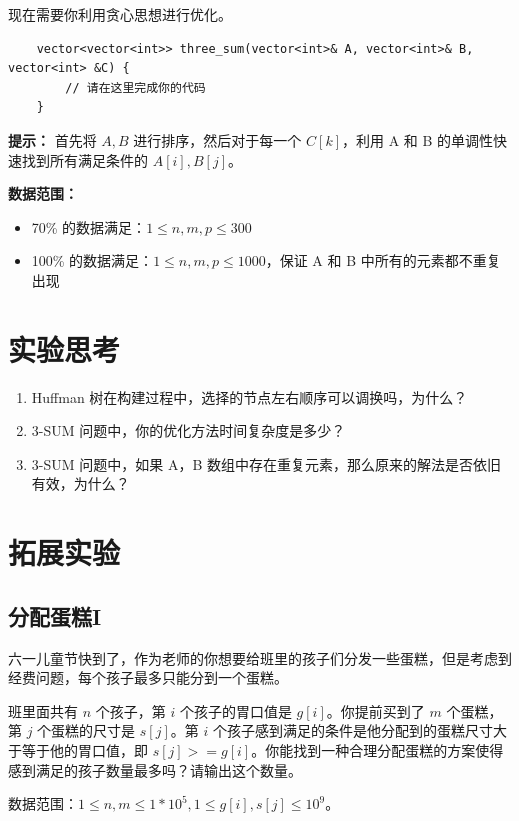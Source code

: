 \documentclass[12pt,a4paper]{article}
\begin{document}
现在需要你利用贪心思想进行优化。

\begin{lstlisting}
    vector<vector<int>> three_sum(vector<int>& A, vector<int>& B, vector<int> &C) {
        // 请在这里完成你的代码
    }
\end{lstlisting}

\textbf{提示：} 首先将 $A,B$ 进行排序，然后对于每一个 $C[k]$，利用 A 和 B 的单调性快速找到所有满足条件的 $A[i], B[j]$。


\textbf{数据范围：}
\begin{itemize}[noitemsep]
    \item 70\% 的数据满足：$1\le n, m, p \le 300$
    \item 100\% 的数据满足：$1\le n, m, p \le 1000$，保证 A 和 B 中所有的元素都不重复出现
\end{itemize}



\section{实验思考}

\begin{enumerate}
    \item Huffman 树在构建过程中，选择的节点左右顺序可以调换吗，为什么？
    \item 3-SUM 问题中，你的优化方法时间复杂度是多少？
    \item 3-SUM 问题中，如果 A，B 数组中存在重复元素，那么原来的解法是否依旧有效，为什么？
\end{enumerate}

\section{拓展实验}

\subsection{分配蛋糕I}
六一儿童节快到了，作为老师的你想要给班里的孩子们分发一些蛋糕，但是考虑到经费问题，每个孩子最多只能分到一个蛋糕。

班里面共有 $n$ 个孩子，第 $i$ 个孩子的胃口值是 $g[i]$。你提前买到了 $m$ 个蛋糕，第 $j$ 个蛋糕的尺寸是 $s[j]$。第 $i$ 个孩子感到满足的条件是他分配到的蛋糕尺寸大于等于他的胃口值，即 $s[j] >= g[i]$。你能找到一种合理分配蛋糕的方案使得感到满足的孩子数量最多吗？请输出这个数量。

数据范围：$1\le n, m \le 1*10^5, 1\le g[i], s[j] \le 10^9$。
\end{document}
